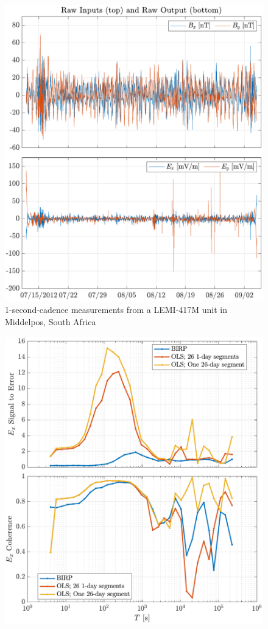 \documentclass{article}
\begin{document}
\begin{figure}[h!]
\centering
\includegraphics[width=\textwidth]{figures/Middelpos/timeseries.pdf}
\caption{1-second-cadence measurements from a LEMI-417M unit in Middelpos, South Africa}
\label{fig:Middelpos_timeseries}
\end{figure}

\begin{figure}[h!]
\centering
\includegraphics[width=\textwidth]{figures/KAP103_Middelpos/SN_compare-E_x.pdf}
\caption{}
\label{fig:SN_Ex_Compare}
\end{figure}
\end{document}
